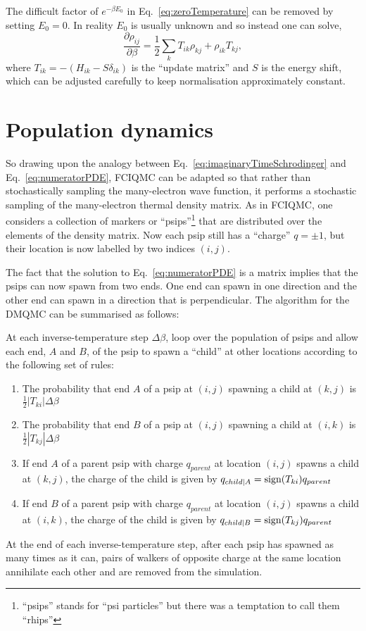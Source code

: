 The difficult factor of $e^{-\beta E_0}$ in Eq.~\ref{eq:zeroTemperature} can be removed by setting $E_0 = 0$. In reality $E_0$ is usually unknown and so instead one can solve,
\begin{equation}
\frac{\partial\rho_{ij}}{\partial\beta} = \frac{1}{2}\sum_{k}T_{ik}\rho_{kj}+\rho_{ik}T_{kj},
\end{equation}
where $T_{ik} = -(H_{ik}-S\delta_{ik})$ is the ``update matrix'' and $S$ is the energy shift, which can be adjusted carefully to keep normalisation approximately constant\cite{Spencer2012}. 

\section{Population dynamics}
\label{sec:populationDynamics}
So drawing upon the analogy between  Eq.~\ref{eq:imaginaryTimeSchrodinger} and Eq.~\ref{eq:numeratorPDE}, FCIQMC can be adapted so that rather than stochastically sampling the many-electron wave function, it performs a stochastic sampling of the many-electron thermal density matrix. As in FCIQMC, one considers a collection of markers or ``psips''\footnote{``psips'' stands for ``psi particles''\cite{Anderson1975} but there was a temptation to call them ``rhips''} that are distributed over the elements of the density matrix. Now each psip still has a ``charge'' $q = \pm 1$, but their location is now labelled by two indices $(i,j)$.

The fact that the solution to Eq.~\ref{eq:numeratorPDE} is a matrix implies that the psips can now spawn from two ends. One end can spawn in one direction and the other end can spawn in a direction that is perpendicular. The algorithm for the DMQMC can be summarised as follows:

At each inverse-temperature step $\Delta\beta$, loop over the population of psips and allow each end, $A$ and $B$, of the psip to spawn a ``child'' at other locations according to the following set of rules: 
\begin{enumerate}
\item The probability that end $A$ of a psip at $(i,j)$ spawning a child at $(k,j)$ is $\frac{1}{2}\left|T_{ki}\right|\Delta\beta$
\item The probability that end $B$ of a psip at $(i,j)$ spawning a child at $(i,k)$ is $\frac{1}{2}\left|T_{kj}\right|\Delta\beta$
\item If end $A$ of a parent psip with charge $q_{parent}$ at location $(i,j)$ spawns a child at $(k,j)$, the charge of the child is given by $q_{child | A}=\textnormal{sign}(T_{ki})q_{parent}$
\item If end $B$ of a parent psip with charge $q_{parent}$ at location $(i,j)$ spawns a child at $(i,k)$, the charge of the child is given by $q_{child | B}=\textnormal{sign}(T_{kj})q_{parent}$
\end{enumerate}
At the end of each inverse-temperature step, after each psip has spawned as many times as it can, pairs of walkers of opposite charge at the same location annihilate each other and are removed from the simulation.

